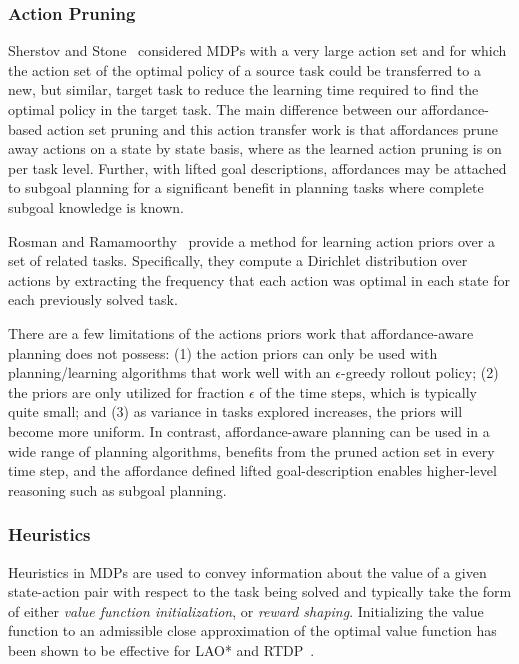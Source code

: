 \documentclass[conference]{IEEEtran}
\begin{document}
\subsubsection{Action Pruning}

Sherstov and Stone~\cite{sherstov2005improving} considered MDPs with a very large 
action set and for which the action set of the optimal policy of a source task could be 
transferred to a new, but similar, target task to reduce the learning time required to find
the optimal policy in the target task. The main difference between our affordance-based 
action set pruning and this action transfer work is that affordances prune away actions on 
a state by state basis, where as the learned action pruning is on per task level. Further, 
with lifted goal descriptions, affordances may be attached to subgoal planning for a significant
benefit in planning tasks where complete subgoal knowledge is known.

Rosman and Ramamoorthy~\cite{rosman2012good} provide a method for learning action
priors over a set of related tasks. Specifically, they compute a Dirichlet distribution over 
actions by extracting the frequency that each action was optimal in each state for each 
previously solved task.

There are a few limitations of the actions priors work that affordance-aware planning
does not possess: (1) the action priors can only be used with planning/learning algorithms
that work well with an $\epsilon$-greedy rollout policy; (2) the priors are only utilized for 
fraction $\epsilon$ of the time steps, which is typically quite small; and (3) as variance in
tasks explored increases, the priors will become more uniform. In contrast, affordance-aware
planning can be used in a wide range of planning algorithms, benefits from the pruned action
set in every time step, and the affordance defined lifted goal-description enables higher-level 
reasoning such as subgoal planning.

\subsubsection{Heuristics}
Heuristics in MDPs are used to convey information about the value of a given state-action pair with respect to the task being solved and typically take the form of either {\em value function initialization},
or {\em reward shaping}. Initializing the value function to an admissible close approximation of the optimal value function has been shown to be effective for LAO* and RTDP~\cite{Hansen:1999qf}.
\end{document}

